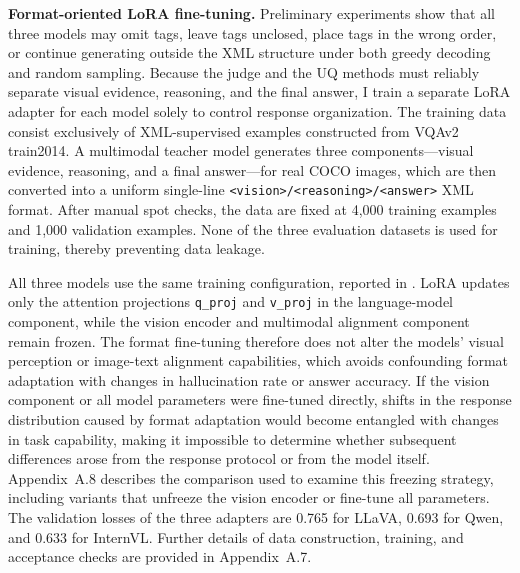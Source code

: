 \textbf{Format-oriented LoRA fine-tuning.} Preliminary experiments show that all three models may omit tags, leave tags unclosed, place tags in the wrong order, or continue generating outside the XML structure under both greedy decoding and random sampling. Because the judge and the UQ methods must reliably separate visual evidence, reasoning, and the final answer, I train a separate LoRA adapter for each model solely to control response organization. The training data consist exclusively of XML-supervised examples constructed from VQAv2 train2014. A multimodal teacher model generates three components---visual evidence, reasoning, and a final answer---for real COCO images, which are then converted into a uniform single-line \texttt{<vision>/<reasoning>/<answer>} XML format. After manual spot checks, the data are fixed at 4,000 training examples and 1,000 validation examples. None of the three evaluation datasets is used for training, thereby preventing data leakage.

All three models use the same training configuration, reported in . LoRA updates only the attention projections \texttt{q\_proj} and \texttt{v\_proj} in the language-model component, while the vision encoder and multimodal alignment component remain frozen. The format fine-tuning therefore does not alter the models' visual perception or image-text alignment capabilities, which avoids confounding format adaptation with changes in hallucination rate or answer accuracy. If the vision component or all model parameters were fine-tuned directly, shifts in the response distribution caused by format adaptation would become entangled with changes in task capability, making it impossible to determine whether subsequent differences arose from the response protocol or from the model itself. Appendix~A.8 describes the comparison used to examine this freezing strategy, including variants that unfreeze the vision encoder or fine-tune all parameters. The validation losses of the three adapters are 0.765 for LLaVA, 0.693 for Qwen, and 0.633 for InternVL. Further details of data construction, training, and acceptance checks are provided in Appendix~A.7.

